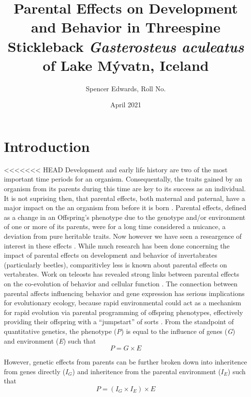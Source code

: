 \documentclass[12pt]{extarticle}
\title{Parental Effects on Development and Behavior in Threespine Stickleback \textit{Gasterosteus aculeatus} of Lake M\'yvatn, Iceland}
\author{Spencer Edwards, Roll No.}
\date{April 2021}
\begin{document}
\maketitle

\section*{Introduction}
<<<<<<< HEAD
Development and early life history are two of the most important time periods for an organism. Consequentally, the traits gained by an organism from its parents during this time are key to its success as an individual. It is not suprising then, that parental effects, both maternal and paternal, have a major impact on the an organism from before it is born \citep{charmantier_garant_kruuk_2014, Danchin2011, Badyaev2009}. Parental effects, defined as a change in an Offspring's phenotype due to the genotype and/or environment of one or more of its parents, were for a long time considered a nuicance, a deviation from pure heritable traits. Now however we have seen a researgence of interest in these effects \citep{charmantier_garant_kruuk_2014}. While much research has been done concerning the impact of parental effects on development \citep{Tigreros2021} and behavior of invertabrates (particularly beetles), comparitivley less is known about parental effects on vertabrates. Work on teleosts has revealed strong links between parental effects on the co-evolution of behavior and cellular function \citep{Yoshizawa2012}. The connection between parental affects influencing behavior and gene expression has serious implications for evolutionary ecology, because rapid environmental could act as a mechanism for rapid evolution via parental programming of offspring phenotypes, effectively providing their offspring with a ``jumpstart'' of sorts \citep{Danchin2011, Donelson2018}. 
From the standpoint of quantitative genetics, the phenotype (\textit{P}) is equal to the influence of genes (\textit{G}) and environment (\textit{E}) such that $$P = G \times E $$

However, genetic effects from parents can be further broken down into inheritence from genes directly ($I_G$) and inheritence from the parental environment ($I_E$) such that $$P = (I_G \times I_E) \times E$$
\end{document}
